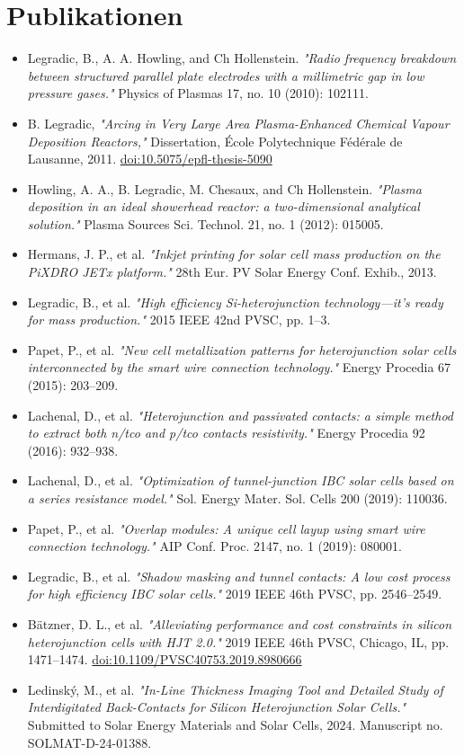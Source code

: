 \documentclass[verylight]{simplehipstercv}
\begin{document}
\section*{Publikationen}
\begin{itemize}
    \item Legradic, B., A. A. Howling, and Ch Hollenstein. \textit{"Radio frequency breakdown between structured parallel plate electrodes with a millimetric gap in low pressure gases."} Physics of Plasmas 17, no. 10 (2010): 102111.
    \item B. Legradic, \textit{"Arcing in Very Large Area Plasma-Enhanced Chemical Vapour Deposition Reactors,"} Dissertation, École Polytechnique Fédérale de Lausanne, 2011. \href{https://doi.org/10.5075/epfl-thesis-5090}{doi:10.5075/epfl-thesis-5090}
    \item Howling, A. A., B. Legradic, M. Chesaux, and Ch Hollenstein. \textit{"Plasma deposition in an ideal showerhead reactor: a two-dimensional analytical solution."} Plasma Sources Sci. Technol. 21, no. 1 (2012): 015005.
    \item Hermans, J. P., et al. \textit{"Inkjet printing for solar cell mass production on the PiXDRO JETx platform."} 28th Eur. PV Solar Energy Conf. Exhib., 2013.
    \item Legradic, B., et al. \textit{"High efficiency Si-heterojunction technology—it's ready for mass production."} 2015 IEEE 42nd PVSC, pp. 1–3.
    \item Papet, P., et al. \textit{"New cell metallization patterns for heterojunction solar cells interconnected by the smart wire connection technology."} Energy Procedia 67 (2015): 203–209.
    \item Lachenal, D., et al. \textit{"Heterojunction and passivated contacts: a simple method to extract both n/tco and p/tco contacts resistivity."} Energy Procedia 92 (2016): 932–938.
    \item Lachenal, D., et al. \textit{"Optimization of tunnel-junction IBC solar cells based on a series resistance model."} Sol. Energy Mater. Sol. Cells 200 (2019): 110036.
    \item Papet, P., et al. \textit{"Overlap modules: A unique cell layup using smart wire connection technology."} AIP Conf. Proc. 2147, no. 1 (2019): 080001.
    \item Legradic, B., et al. \textit{"Shadow masking and tunnel contacts: A low cost process for high efficiency IBC solar cells."} 2019 IEEE 46th PVSC, pp. 2546–2549.
    \item Bätzner, D. L., et al. \textit{"Alleviating performance and cost constraints in silicon heterojunction cells with HJT 2.0."} 2019 IEEE 46th PVSC, Chicago, IL, pp. 1471–1474. \href{https://doi.org/10.1109/PVSC40753.2019.8980666}{doi:10.1109/PVSC40753.2019.8980666}
    \item Ledinský, M., et al. \textit{"In-Line Thickness Imaging Tool and Detailed Study of Interdigitated Back-Contacts for Silicon Heterojunction Solar Cells."} Submitted to Solar Energy Materials and Solar Cells, 2024. Manuscript no. SOLMAT-D-24-01388.
\end{itemize}
\end{document}
